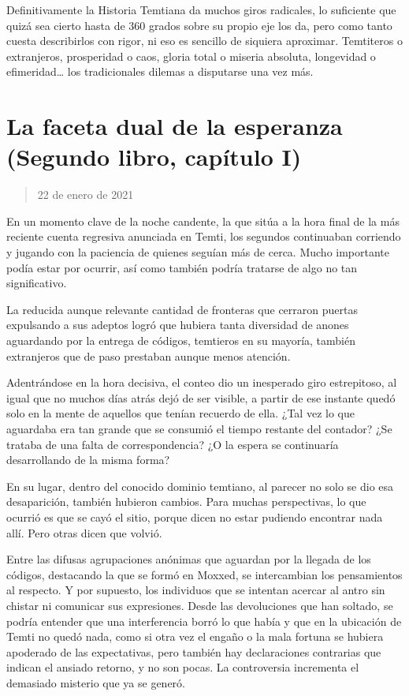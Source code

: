 \documentclass[
]{book}
\begin{document}
Definitivamente la Historia Temtiana da muchos giros radicales, lo suficiente que quizá sea cierto hasta de 360 grados sobre su propio eje los da, pero como tanto cuesta describirlos con rigor, ni eso es sencillo de siquiera aproximar. Temtiteros o extranjeros, prosperidad o caos, gloria total o miseria absoluta, longevidad o efimeridad\ldots{} los tradicionales dilemas a disputarse una vez más.

\hypertarget{la-faceta-dual-de-la-esperanza-segundo-libro-capuxedtulo-i}{%
\section{La faceta dual de la esperanza (Segundo libro, capítulo I)}\label{la-faceta-dual-de-la-esperanza-segundo-libro-capuxedtulo-i}}

\begin{quote}
22 de enero de 2021
\end{quote}

En un momento clave de la noche candente, la que sitúa a la hora final de la más reciente cuenta regresiva anunciada en Temti, los segundos continuaban corriendo y jugando con la paciencia de quienes seguían más de cerca. Mucho importante podía estar por ocurrir, así como también podría tratarse de algo no tan significativo.

La reducida aunque relevante cantidad de fronteras que cerraron puertas expulsando a sus adeptos logró que hubiera tanta diversidad de anones aguardando por la entrega de códigos, temtieros en su mayoría, también extranjeros que de paso prestaban aunque menos atención.

Adentrándose en la hora decisiva, el conteo dio un inesperado giro estrepitoso, al igual que no muchos días atrás dejó de ser visible, a partir de ese instante quedó solo en la mente de aquellos que tenían recuerdo de ella. ¿Tal vez lo que aguardaba era tan grande que se consumió el tiempo restante del contador? ¿Se trataba de una falta de correspondencia? ¿O la espera se continuaría desarrollando de la misma forma?

En su lugar, dentro del conocido dominio temtiano, al parecer no solo se dio esa desaparición, también hubieron cambios. Para muchas perspectivas, lo que ocurrió es que se cayó el sitio, porque dicen no estar pudiendo encontrar nada allí. Pero otras dicen que volvió.

Entre las difusas agrupaciones anónimas que aguardan por la llegada de los códigos, destacando la que se formó en Moxxed, se intercambian los pensamientos al respecto. Y por supuesto, los individuos que se intentan acercar al antro sin chistar ni comunicar sus expresiones. Desde las devoluciones que han soltado, se podría entender que una interferencia borró lo que había y que en la ubicación de Temti no quedó nada, como si otra vez el engaño o la mala fortuna se hubiera apoderado de las expectativas, pero también hay declaraciones contrarias que indican el ansiado retorno, y no son pocas. La controversia incrementa el demasiado misterio que ya se generó.
\end{document}
